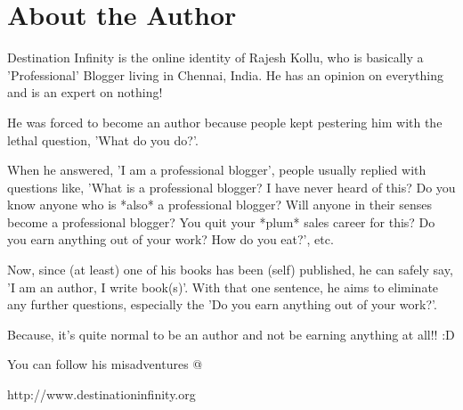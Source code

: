 \chapter{About the Author}

Destination Infinity is the online identity of Rajesh Kollu, who is basically a
'Professional' Blogger living in Chennai, India. He has an opinion on everything
and is an expert on nothing!

He was forced to become an author because people kept pestering him with the
lethal question, 'What do you do?'.

When he answered, 'I am a professional blogger', people usually replied with
questions like, 'What is a professional blogger? I have never heard of this? Do
you know anyone who is *also* a professional blogger? Will anyone in their
senses become a professional blogger? You quit your *plum* sales career for
this? Do you earn anything out of your work? How do you eat?', etc.

Now, since (at least) one of his books has been (self) published, he can safely
say, 'I am an author, I write book(s)'. With that one sentence, he aims to
eliminate any further questions, especially the 'Do you earn anything out of
your work?'.

Because, it's quite normal to be an author and not be earning anything at all!!
:D

You can follow his misadventures @

\centerline{http://www.destinationinfinity.org}